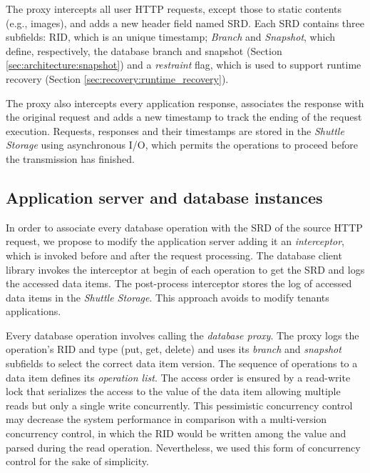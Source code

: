 The proxy intercepts all user HTTP requests, except those to static contents (e.g., images), and adds a new header field named \acf{SRD}. Each \ac{SRD} contains three subfields: \acf{RID}, which is an unique timestamp; \emph{Branch} and \emph{Snapshot}, which define, respectively, the database branch and snapshot (Section \ref{sec:architecture:snapshot}) and a \emph{restraint} flag, which is used to support runtime recovery (Section \ref{sec:recovery:runtime_recovery}). 

The proxy also intercepts every application response, associates the response with the original request and adds a new timestamp to track the ending of the request execution. Requests, responses and their timestamps are stored in the \emph{Shuttle Storage} using asynchronous I/O, which permits the operations to proceed before the transmission has finished. 


\subsection{Application server and database instances}
\label{sec:architecture:database}

In order to associate every database operation with the \acf{SRD} of the source HTTP request, we propose to modify the application server adding it an \emph{interceptor}, which is invoked before and after the request processing. The database client library invokes the interceptor at begin of each operation to get the \ac{SRD} and logs the accessed data items. The post-process interceptor stores the log of accessed data items in the \emph{Shuttle Storage}. This approach avoids to modify tenants applications.

Every database operation involves calling the \emph{database proxy}. The proxy logs the operation's \acf{RID} and type (put, get, delete) and uses its \emph{branch} and \emph{snapshot} subfields to select the correct data item version. The sequence of operations to a data item defines its \emph{operation list}.  
The access order is ensured by a read-write lock that serializes the access to the value of the data item allowing multiple reads but only a single write concurrently. This pessimistic concurrency control may decrease the system performance in comparison with a multi-version concurrency control, in which the \ac{RID} would be written among the value and parsed during the read operation. Nevertheless, we used this form of concurrency control for the sake of simplicity.

